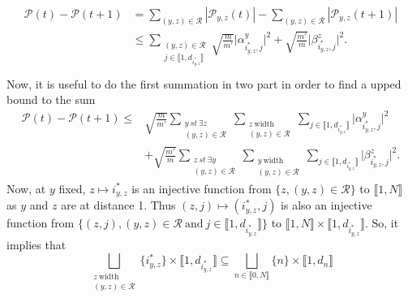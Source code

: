 \begin{appendix}
\begin{tproof}
        \begin{align*}
            \mathcal{P}(t)- \mathcal{P}(t+1) & = \sum_{(y,z)\in\mathcal{R}} \left\vert\mathcal{P}_{y,z}(t)\right\vert - \sum_{(y,z)\in\mathcal{R}} \left\vert\mathcal{P}_{y,z}(t+1)\right\vert         \\
                                             & \leq \sum_{\begin{matrix}
                    (y,z) \in \mathcal{R} \\
                    j\in\llbracket1,d_{i^*_{y,z}}\rrbracket
                \end{matrix}} \sqrt{\frac{m}{m'}}\vert\alpha^{y}_{i^*_{y,z},j}\vert^2 + \sqrt{\frac{m'}{m}}\vert\beta^{z}_{i^*_{y,z},j}\vert^2. \\
        \end{align*}
        Now, it is useful to do the first summation in two part in order to find a upped bound to the sum
        \begin{align*}
            \mathcal{P}(t)- \mathcal{P}(t+1)  \leq & \sqrt{\frac{m}{m'}}
            \sum_{\substack{y\ st\ \exists z                                                               \\ (y,z) \in \mathcal{R}}}
            \sum_{\substack{z\ \textrm{width}                                                              \\ (y,z) \in \mathcal{R}}}
            \sum_{j\in\llbracket1,d_{i^*_{y,z}}\rrbracket}\vert\alpha^{y}_{i^*_{y,z},j}\vert^2             \\
                                                   & +\sqrt{\frac{m'}{m}} \sum_{\substack{z\ st\ \exists y \\ (y,z) \in \mathcal{R}}}
            \sum_{\substack{y\ \textrm{width}                                                              \\ (y,z) \in \mathcal{R}}}
            \sum_{j\in\llbracket1,d_{i^*_{y,z}}\rrbracket}\vert\beta^{z}_{i^*_{y,z},j}\vert^2.
        \end{align*}
        Now, at $y$ fixed, $z \mapsto i^*_{y,z}$ is an injective function from $\{z, (y,z)\in \mathcal{R\}}$ to $\llbracket1, N\rrbracket$ as
        $y$ and $z$ are at distance 1. Thus $(z,j) \mapsto (i^*_{y,z}, j)$ is also an injective function
        from $\{(z,j), (y,z)\in \mathcal{R}\ \textrm{and}\ j \in \llbracket1, d_{i^*_{y,z}}\rrbracket\}$ to
        $\llbracket1, N\rrbracket\times\llbracket1, d_{i^*_{y,z}}\rrbracket$.
        So, it implies that
        \[ \bigsqcup_{\substack{z\ \textrm{width}\\ (y,z) \in \mathcal{R}}} \{i^*_{y,z}\}\times \llbracket 1,d_{i^*_{y,z}}\rrbracket\subseteq \bigsqcup_{n \in \llbracket0,N\rrbracket} \{n\}\times\llbracket1,d_n\rrbracket\]

\end{tproof}
\end{appendix}

